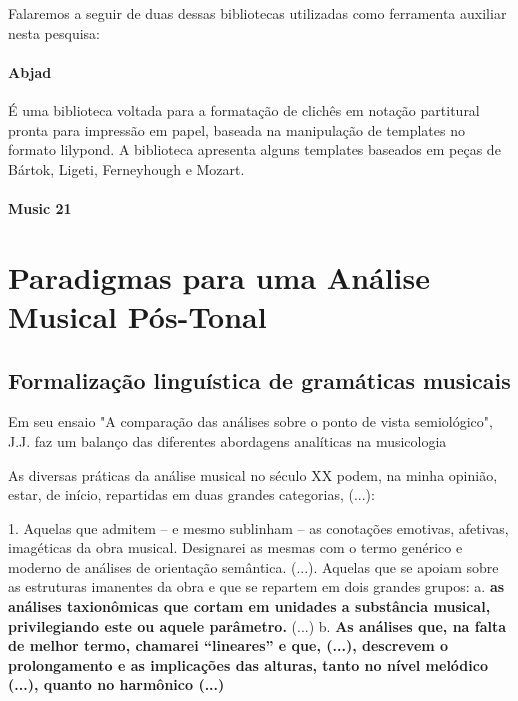\documentclass[
	12pt,				%
	openright,			%
	twoside,			%
	a4paper,			%
	english,			%
	french,				%
	spanish,			%
	brazil				%
	]{abntex2}
\begin{document}
Falaremos a seguir de duas dessas bibliotecas utilizadas como ferramenta auxiliar nesta pesquisa:


\subsection{Abjad}

É uma biblioteca voltada para a formatação de clichês em notação partitural pronta para impressão em papel, baseada na manipulação de templates no formato lilypond. A biblioteca apresenta alguns templates baseados em peças de Bártok, Ligeti, Ferneyhough e Mozart.



\subsection{Music 21}









\part{Paradigmas para uma Análise Musical Pós-Tonal}
\label{analises}




\chapter{Formalização linguística de gramáticas musicais }

Em seu ensaio "A comparação das análises sobre o ponto de vista semiológico", J.J.  faz um balanço das diferentes abordagens analíticas na musicologia 

\begin{citacao}
As diversas práticas da análise musical no século XX podem, na minha opinião, estar, de início, repartidas em duas grandes categorias, (...): 

1. Aquelas que admitem – e mesmo sublinham – as conotações emotivas, afetivas, imagéticas da obra musical. Designarei as mesmas com o termo genérico e moderno de análises de orientação semântica. (...). Aquelas que se apoiam sobre as estruturas imanentes da obra e que se repartem em dois grandes grupos: a. \textbf{as análises taxionômicas que cortam em unidades a substância musical, privilegiando este ou aquele parâmetro. }(...) b. \textbf{As análises que, na falta de melhor termo, chamarei “lineares” e que, (...), 
descrevem o prolongamento e as implicações das alturas, tanto no nível melódico (...), quanto no harmônico (...)}
\cite[grifos nossos]{nattiezcomparaccao}
\end{citacao}
\end{document}
